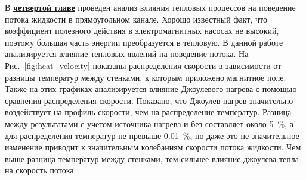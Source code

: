 В \underline{\textbf{четвертой главе}} проведен анализ влияния тепловых процессов на поведение потока жидкости в прямоугольном канале. Хорошо известный факт, что коэффициент полезного действия в электромагнитных насосах не высокий, поэтому большая часть энергии преобразуется в тепловую. В данной работе анализируется влияние тепловых явлений на поведение потока. На Рис.~\ref{fig:heat_velocity} показаны распределения скорости в зависимости от разницы температур между стенками, к которым приложено магнитное поле. Также на этих графиках анализируется влияние Джоулевого нагрева с помощью сравнения распределения скорости. Показано, что Джоулев нагрев значительно воздействует на профиль скорости, чем на распределение температур. Разница между результатами с учетом источника нагрева и без составляет около 5~\%, а для распределения температур не превыше 0.01~\%, но даже это не значительное изменение приводит к значительным колебаниям скорости потока жидкости. Чем выше разница температур между стенками, тем сильнее влияние джоулева тепла на скорость потока. 

